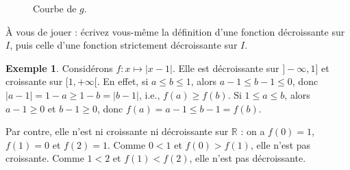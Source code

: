 \documentclass[12pt,a4paper]{article}
\theoremstyle{plain}
\theoremstyle{definition}
\newtheorem{example}[theorem]{Exemple}
\theoremstyle{remark}
\begin{document}
\begin{figure}[htbp]
  \centering
  \begin{minipage}[t]{0.47\linewidth}
    \centering
    \caption{Courbe de $f : x \mapsto 2x + 1$.}
    \label{fig:strict_croissante}
  \end{minipage}\hfill
  \begin{minipage}[t]{0.47\linewidth}
    \centering
    \caption{Courbe de $g$.}
    \label{fig:croissante_non_stricte}
  \end{minipage}
\end{figure}

À vous de jouer : écrivez vous-même la définition d'une fonction décroissante sur
$I$, puis celle d'une fonction strictement décroissante sur $I$.

\begin{example}
  \label{eg:non_monotone}
  Considérons $f : x \mapsto \lvert x - 1 \rvert$. Elle est décroissante sur
  $]-\infty, 1]$ et croissante sur $[1, +\infty[$. En effet, si $a \le b \le 1$, alors
  $a - 1 \le b - 1 \le 0$, donc $\lvert a - 1 \rvert = 1 - a \ge 1 - b =
  \lvert b - 1 \rvert$, i.e., $f(a) \ge f(b)$. Si $1 \le a \le b$, alors $a - 1 \ge 0$
  et $b - 1 \ge 0$, donc $f(a) = a - 1 \le b - 1 = f(b)$.
  
  Par contre, elle n'est ni croissante ni décroissante sur $\mathbb{R}$ : on a
  $f(0) = 1$, $f(1) = 0$ et $f(2) = 1$. Comme $0 < 1$ et $f(0) > f(1)$, elle n'est pas
  croissante. Comme $1 < 2$ et $f(1) < f(2)$, elle n'est pas décroissante.
\end{example}
\end{document}
